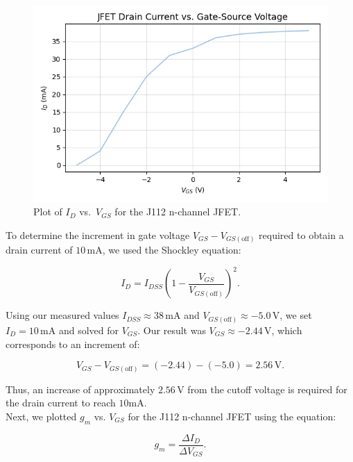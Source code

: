 \documentclass{article}
\begin{document}
\begin{figure}[H]
    \centering
    \includegraphics[width=0.8\linewidth]{6.1a.png}
    \caption{Plot of $I_D$ vs.\ $V_{GS}$ for the J112 n-channel JFET.}
    \label{fig:jfet_id_vgs}
\end{figure}

\noindent To determine the increment in gate voltage $V_{GS} - V_{GS(\text{off})}$
required to obtain a drain current of $10\,\si{\milli\ampere}$, we used the
Shockley equation:

\begin{equation}
    I_D = I_{DSS} \left( 1 - \frac{V_{GS}}{V_{GS(\text{off})}} \right)^2.
\end{equation}

\noindent Using our measured values $I_{DSS} \approx 38\,\si{\milli\ampere}$ and 
$V_{GS(\text{off})} \approx -5.0\,\si{\volt}$, we set $I_D = 10\,\si{\milli\ampere}$ 
and solved for $V_{GS}$. Our result was $V_{GS} \approx -2.44\,\si{\volt}$, which 
corresponds to an increment of:

\begin{equation}
    V_{GS} - V_{GS(\text{off})} = (-2.44) - (-5.0) = 2.56\,\si{\volt}.
\end{equation}

\noindent Thus, an increase of approximately $2.56\,\si{\volt}$ from the
cutoff voltage is required for the drain current to reach 
$10\si{\milli\ampere}$.\\

\noindent Next, we plotted $g_m$ vs. $V_{GS}$ for the J112 n-channel JFET using the equation:

\begin{equation}
    g_m = \frac{\Delta I_D}{\Delta V_{GS}}.
\end{equation}
\end{document}
